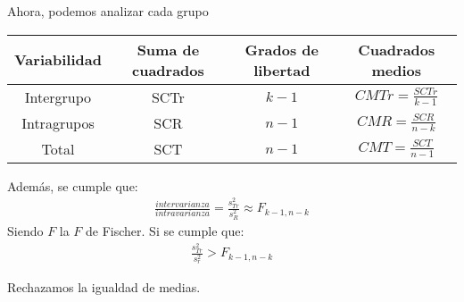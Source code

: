 \documentclass{article}
\begin{document}
Ahora, podemos analizar cada grupo
\begin{table}[h]
	\centering
	\begin{tabular}{c | c | c|c}
		Variabilidad & Suma de cuadrados & Grados de libertad & Cuadrados medios\\
		\hline
		Intergrupo & SCTr & $k-1$ & $CMTr = \frac{SCTr}{k-1}$ \\
		Intragrupos & SCR & $n-1$ & $CMR = \frac{SCR}{n-k}$ \\
		Total & SCT & $n-1$ & $CMT = \frac{SCT}{n-1}$  
	\end{tabular}
\end{table}
Además, se cumple que:
\begin{equation}
	\begin{split}
		\frac{intervarianza}{intravarianza} = \frac{s^{2}_{Tr}}{s^{2}_{R}}
		\approx F_{k-1,n-k}
	\end{split}
\end{equation}
Siendo $F$ la $F$ de Fischer. Si se cumple que:
\begin{equation}
	\begin{split}
		\frac{s^{2}_{Tr}}{s^{2}_{r}} > F_{k-1,n-k}
	\end{split}
\end{equation}
\begin{centering}
	\huge Rechazamos la igualdad de medias.	
\end{centering}
\end{document}
